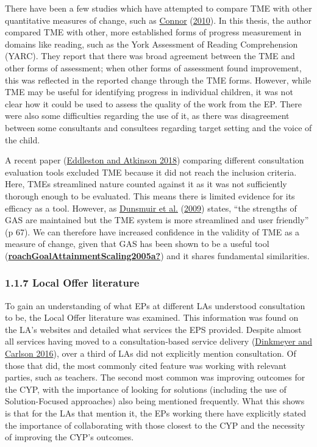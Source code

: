 \documentclass[
]{article}
\begin{document}
There have been a few studies which have attempted to compare TME with
other quantitative measures of change, such as
\protect\hyperlink{ref-connorTargetMonitoringEvaluation2010}{Connor}
(\protect\hyperlink{ref-connorTargetMonitoringEvaluation2010}{2010}). In
this thesis, the author compared TME with other, more established forms
of progress measurement in domains like reading, such as the York
Assessment of Reading Comprehension (YARC). They report that there was
broad agreement between the TME and other forms of assessment; when
other forms of assessment found improvement, this was reflected in the
reported change through the TME forms. However, while TME may be useful
for identifying progress in individual children, it was not clear how it
could be used to assess the quality of the work from the EP. There were
also some difficulties regarding the use of it, as there was
disagreement between some consultants and consultees regarding target
setting and the voice of the child.

A recent paper
(\protect\hyperlink{ref-eddlestonUsingProfessionalPractice2018}{Eddleston
and Atkinson 2018}) comparing different consultation evaluation tools
excluded TME because it did not reach the inclusion criteria. Here, TMEs
streamlined nature counted against it as it was not sufficiently
thorough enough to be evaluated. This means there is limited evidence
for its efficacy as a tool. However, as
\protect\hyperlink{ref-dunsmuirEvidenceBasedPractice2009}{Dunsmuir et
al.} (\protect\hyperlink{ref-dunsmuirEvidenceBasedPractice2009}{2009})
states, ``the strengths of GAS are maintained but the TME system is more
streamlined and user friendly'' (p 67). We can therefore have increased
confidence in the validity of TME as a measure of change, given that GAS
has been shown to be a useful tool
(\protect\hyperlink{ref-roachGoalAttainmentScaling2005a}{\textbf{roachGoalAttainmentScaling2005a?}})
and it shares fundamental similarities.

\hypertarget{local-offer-literature}{%
\subsubsection{1.1.7 Local Offer
literature}\label{local-offer-literature}}

To gain an understanding of what EPs at different LAs understood
consultation to be, the Local Offer literature was examined. This
information was found on the LA's websites and detailed what services
the EPS provided. Despite almost all services having moved to a
consultation-based service delivery
(\protect\hyperlink{ref-dinkmeyerConsultationCreatingSchoolBased2016}{Dinkmeyer
and Carlson 2016}), over a third of LAs did not explicitly mention
consultation. Of those that did, the most commonly cited feature was
working with relevant parties, such as teachers. The second most common
was improving outcomes for the CYP, with the importance of looking for
solutions (including the use of Solution-Focused approaches) also being
mentioned frequently. What this shows is that for the LAs that mention
it, the EPs working there have explicitly stated the importance of
collaborating with those closest to the CYP and the necessity of
improving the CYP's outcomes.
\end{document}
